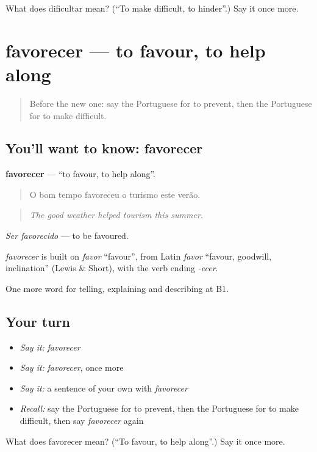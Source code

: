 \begin{tcolorbox}[breakable,colback=teal!4,colframe=teal!35!black,title={Before you move on}]
What does dificultar mean? (\textquotedblleft{}To make difficult, to hinder\textquotedblright{}.) Say it once more.
\end{tcolorbox}
\section[favorecer]{favorecer — to favour, to help along}

\label{lesson:PT-C353-favorecer}



\begin{quote}
Before the new one: say the Portuguese for to prevent, then the Portuguese for to make difficult.
\end{quote}

\subsection*{You'll want to know: favorecer}
\textbf{favorecer} — \textquotedblleft{}to favour, to help along\textquotedblright{}.

\begin{quote}
O bom tempo favoreceu o turismo este verão.
\end{quote}

\begin{quote}
\emph{The good weather helped tourism this summer.}
\end{quote}

\emph{Ser favorecido} — to be favoured.

\begin{cousinweb}
\emph{favorecer} is built on \emph{favor} \textquotedblleft{}favour\textquotedblright{}, from Latin \emph{favor} \textquotedblleft{}favour, goodwill, inclination\textquotedblright{} (Lewis \& Short), with the verb ending \emph{-ecer}.
\end{cousinweb}

\begin{grammarlens}[title={What you've built}]
One more word for telling, explaining and describing at B1.
\end{grammarlens}

\subsection*{Your turn}
\begin{itemize}
\raggedright
  \item \emph{Say it:} \emph{favorecer}
  \item \emph{Say it:} \emph{favorecer}, once more
  \item \emph{Say it:} a sentence of your own with \emph{favorecer}
  \item \emph{Recall:} say the Portuguese for to prevent, then the Portuguese for to make difficult, then say \emph{favorecer} again
\end{itemize}

\begin{tcolorbox}[breakable,colback=teal!4,colframe=teal!35!black,title={Before you move on}]
What does favorecer mean? (\textquotedblleft{}To favour, to help along\textquotedblright{}.) Say it once more.
\end{tcolorbox}
